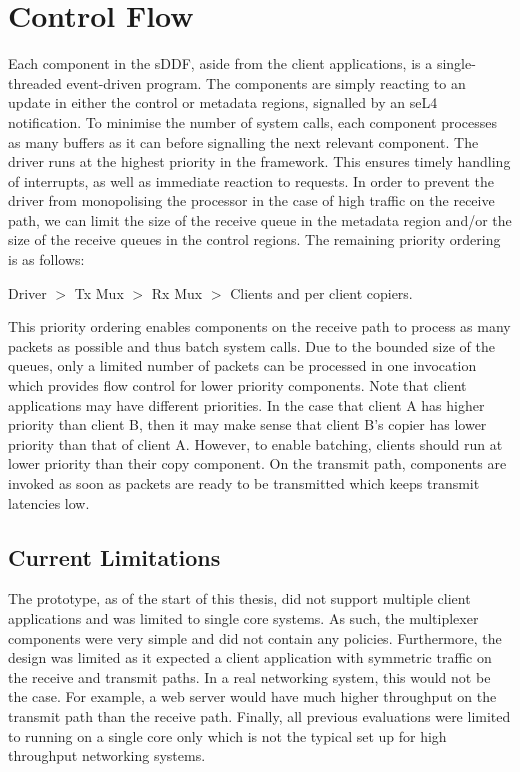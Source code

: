 \section{Control Flow}
Each component in the sDDF, aside from the client applications, is a single-threaded event-driven program. The
components are simply reacting to an update in either the control or metadata regions, signalled by an seL4 notification. 
To minimise the number of system calls, each component processes as many buffers as it can before signalling the next
relevant component.
The driver runs at the highest priority in the framework. This ensures timely handling of interrupts, as well
as immediate reaction to requests. In order to prevent the driver from monopolising the processor in the case
of high traffic on the receive path, we can limit the size of the receive queue in the metadata region and/or 
the size of the receive queues in the control regions.
The remaining priority ordering is as follows:

\centerline{Driver \(>\) Tx Mux \(>\) Rx Mux \(>\) Clients and per client copiers.}

This priority ordering enables components on the receive path to process as many packets as possible and
thus batch system calls. Due to the bounded size of the queues, only a limited number of packets 
can be processed in one invocation which provides flow control for lower priority components. Note that
client applications may have different priorities. In the case that client A has higher priority
than client B, then it may make sense that client B's copier has lower priority than that of client A.
However, to enable batching, clients should run at lower priority than their copy component. 
On the transmit path, components are invoked as soon as packets are 
ready to be transmitted which keeps transmit latencies low.

\subsection{Current Limitations}
The prototype, as of the start of this thesis, did not support multiple client applications and 
was limited to single core systems. As such, the multiplexer components were very simple and did not contain any policies. Furthermore, the 
design was limited as it expected a client application with symmetric traffic on the receive and transmit paths. In a real
networking system, this would not be the case. For example, a web server would have much higher throughput on the transmit path than the receive path.
Finally, all previous evaluations were limited to running on a single core only which is not the typical set up for high throughput networking systems.

